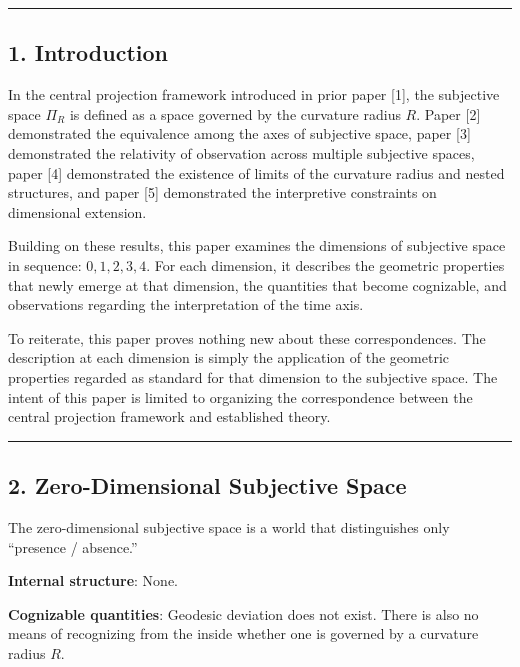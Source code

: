 \documentclass[a4paper,11pt]{article}
\theoremstyle{definition}
\begin{document}
\begin{center}\rule{0.5\linewidth}{0.5pt}\end{center}

\subsection{1. Introduction}\label{introduction}

In the central projection framework introduced in prior paper {[}1{]}, the subjective space \(\Pi_R\) is defined as a space governed by the curvature radius \(R\). Paper {[}2{]} demonstrated the equivalence among the axes of subjective space, paper {[}3{]} demonstrated the relativity of observation across multiple subjective spaces, paper {[}4{]} demonstrated the existence of limits of the curvature radius and nested structures, and paper {[}5{]} demonstrated the interpretive constraints on dimensional extension.

Building on these results, this paper examines the dimensions of subjective space in sequence: \(0, 1, 2, 3, 4\). For each dimension, it describes the geometric properties that newly emerge at that dimension, the quantities that become cognizable, and observations regarding the interpretation of the time axis.

To reiterate, this paper proves nothing new about these correspondences. The description at each dimension is simply the application of the geometric properties regarded as standard for that dimension to the subjective space. The intent of this paper is limited to organizing the correspondence between the central projection framework and established theory.

\begin{center}\rule{0.5\linewidth}{0.5pt}\end{center}

\subsection{2. Zero-Dimensional Subjective Space}\label{zero-dimensional-subjective-space}

The zero-dimensional subjective space is a world that distinguishes only ``presence / absence.''

\textbf{Internal structure}: None.

\textbf{Cognizable quantities}: Geodesic deviation does not exist. There is also no means of recognizing from the inside whether one is governed by a curvature radius \(R\).
\end{document}
